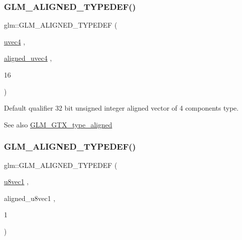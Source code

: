 \subsubsection{\texorpdfstring{G\+L\+M\+\_\+\+A\+L\+I\+G\+N\+E\+D\+\_\+\+T\+Y\+P\+E\+D\+E\+F()}{GLM\_ALIGNED\_TYPEDEF()}\hspace{0.1cm}{\footnotesize\ttfamily [120/209]}}
{\footnotesize\ttfamily glm\+::\+G\+L\+M\+\_\+\+A\+L\+I\+G\+N\+E\+D\+\_\+\+T\+Y\+P\+E\+D\+EF (\begin{DoxyParamCaption}\item[{\mbox{\hyperlink{group__core__types_ga1c426d19627b32b14f0089f7f4ba7b1d}{uvec4}}}]{,  }\item[{\mbox{\hyperlink{group__gtc__type__aligned_ga1e0792f3c64836e042ee3aad9bd8209c}{aligned\+\_\+uvec4}}}]{,  }\item[{16}]{ }\end{DoxyParamCaption})}

Default qualifier 32 bit unsigned integer aligned vector of 4 components type. \begin{DoxySeeAlso}{See also}
\mbox{\hyperlink{group__gtx__type__aligned}{G\+L\+M\+\_\+\+G\+T\+X\+\_\+type\+\_\+aligned}} 
\end{DoxySeeAlso}
\mbox{\label{group__gtx__type__aligned_ga5611d6718e3a00096918a64192e73a45}} 
\subsubsection{\texorpdfstring{G\+L\+M\+\_\+\+A\+L\+I\+G\+N\+E\+D\+\_\+\+T\+Y\+P\+E\+D\+E\+F()}{GLM\_ALIGNED\_TYPEDEF()}\hspace{0.1cm}{\footnotesize\ttfamily [121/209]}}
{\footnotesize\ttfamily glm\+::\+G\+L\+M\+\_\+\+A\+L\+I\+G\+N\+E\+D\+\_\+\+T\+Y\+P\+E\+D\+EF (\begin{DoxyParamCaption}\item[{\mbox{\hyperlink{group__gtc__type__precision_ga5b0875b5979b80a0ccb371bf7f0f95d8}{u8vec1}}}]{,  }\item[{aligned\+\_\+u8vec1}]{,  }\item[{1}]{ }\end{DoxyParamCaption})}


